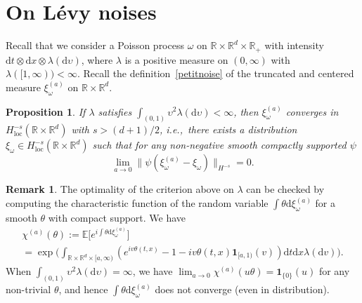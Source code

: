 \documentclass[11pt]{article}
\newcommand{\ie}{i.e.,\xspace}
\numberwithin{equation}{section}
\newtheorem{proposition}[theorem]{Proposition}
\theoremstyle{definition}
\newtheorem{rem}[theorem]{Remark}
\newcommand{\dd}{\mathrm{d}}
\newcommand{\ind}{\mathbf{1}}
\newcommand{\bbE}{{\ensuremath{\mathbb E}} }
\newcommand{\bbR}{{\ensuremath{\mathbb R}} }
\let\gl\lambda
\let\ups\upsilon
\let\go\omega
\begin{document}
\appendix

\section{On Lévy noises}

Recall that we consider a Poisson process $\go$ on $\bbR\times \bbR^d \times \bbR_+$ with intensity
\hbox{$\dd t \otimes \dd x \otimes \gl(\dd \ups)$},
where $\gl$ is a positive measure on $(0,\infty)$ with $\lambda([1,\infty))<\infty$.
Recall the definition~\eqref{petitnoise} of the truncated and centered measure $\xi_{\go}^{(a)}$ on $\bbR\times \bbR^d$.

\begin{proposition}\label{convergence2}
If $\gl$ satisfies
$\int_{(0,1)} \ups^2 \gl(\dd \ups)<\infty$,
then $\xi^{(a)}_{\go}$ converges in \hbox{$H^{-s}_{\mathrm{loc}}(\bbR\times \bbR^d)$} with $s>(d+1)/2$, \ie \ there exists a distribution $\xi_{\go} \in H^{-s}_{\mathrm{loc}}(\bbR\times \bbR^d)$ such that
for any non-negative smooth compactly supported $\psi$
\begin{equation}
\lim_{a\to 0} \| \psi(\xi_{\go}^{(a)}-\xi_{\go}) \|_{H^{-s}}=0.
\end{equation}
\end{proposition}

\begin{rem}
\label{rem:noiseL2}
The optimality of the criterion above on $\gl$ can be checked by computing the characteristic function of the random variable $\int \theta \dd \xi_{\go}^{(a)}$ for a smooth $\theta$ with compact support. We have
\begin{multline*}
\chi^{(a)}(\theta):=\bbE\bigl[ e^{i \int \theta \dd \xi_{\go}^{(a)}} \bigr] \\
=\exp\biggl(\int_{ \bbR\times \bbR^d \times [a,\infty)} \left(e^{i v \theta(t,x)}-1-iv\theta(t,x)\ind_{[a,1)}(v)\right) \dd t \dd x \gl(\dd v)\biggr).
\end{multline*}
When $\int_{(0,1)} \ups^2 \gl(\dd \ups)=\infty$, we have $\lim_{a\to 0} \chi^{(a)}(u\theta)=\ind_{\{0\}}(u)$ for any non-trivial $\theta$, and hence $\int \theta \dd \xi_{\go}^{(a)}$ does not converge (even in distribution).
\end{rem}
\end{document}
